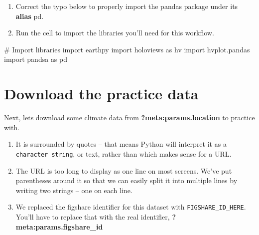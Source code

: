 \documentclass[
  letterpaper,
  DIV=11,
  numbers=noendperiod,
  oneside]{scrreprt}
\newenvironment{Shaded}{\begin{snugshade}}{\end{snugshade}}
\newcommand{\CommentTok}[1]{\textcolor[rgb]{0.37,0.37,0.37}{#1}}
\newcommand{\ImportTok}[1]{\textcolor[rgb]{0.00,0.46,0.62}{#1}}
\newcommand{\NormalTok}[1]{\textcolor[rgb]{0.00,0.23,0.31}{#1}}
\providecommand{\tightlist}{%
  \setlength{\itemsep}{0pt}\setlength{\parskip}{0pt}}
\begin{document}
\begin{tcolorbox}[enhanced jigsaw, colbacktitle=quarto-callout-color!10!white, opacityback=0, bottomtitle=1mm, toptitle=1mm, bottomrule=.15mm, left=2mm, colframe=quarto-callout-color-frame, leftrule=.75mm, opacitybacktitle=0.6, colback=white, rightrule=.15mm, toprule=.15mm, breakable, titlerule=0mm, title=\textcolor{quarto-callout-color}{\faInfo}\hspace{0.5em}{Try It: Import packages}, coltitle=black, arc=.35mm]

\begin{enumerate}
\def\labelenumi{\arabic{enumi}.}
\tightlist
\item
  Correct the typo below to properly import the pandas package under its
  \textbf{alias} pd.
\item
  Run the cell to import the libraries you'll need for this workflow.
\end{enumerate}

\end{tcolorbox}

\begin{Shaded}
\begin{Highlighting}[]
\CommentTok{\# Import libraries}
\ImportTok{import}\NormalTok{ earthpy}
\ImportTok{import}\NormalTok{ holoviews }\ImportTok{as}\NormalTok{ hv}
\ImportTok{import}\NormalTok{ hvplot.pandas}
\ImportTok{import}\NormalTok{ pandsa }\ImportTok{as}\NormalTok{ pd}
\end{Highlighting}
\end{Shaded}

\section{Download the practice data}\label{download-the-practice-data-1}

Next, lets download some climate data from
\textbf{?meta:params.location} to practice with.

\begin{enumerate}
\def\labelenumi{\arabic{enumi}.}
\tightlist
\item
  It is surrounded by quotes -- that means Python will interpret it as a
  \texttt{character\ string}, or text, rather than which makes sense for
  a URL.
\item
  The URL is too long to display as one line on most screens. We've put
  parentheses around it so that we can easily split it into multiple
  lines by writing two strings -- one on each line.
\item
  We replaced the figshare identifier for this dataset with
  \texttt{\textquotesingle{}FIGSHARE\_ID\_HERE\textquotesingle{}}.
  You'll have to replace that with the real identifier,
  \textbf{?meta:params.figshare\_id}
\end{enumerate}
\end{document}
